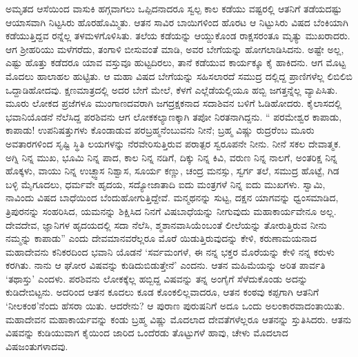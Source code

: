 ಅಮೃತದ ಆಸೆಯಿಂದ ವಾಸುಕಿ ಹಗ್ಗವಾಗಲು ಒಪ್ಪಿದನಾದರೂ ಸ್ವಲ್ಪ ಕಾಲ ಕಡೆಯು ವಷ್ಟರಲ್ಲಿ ಆತನಿಗೆ ತಡೆಯದಷ್ಟು ಆಯಾಸವಾಗಿ ನಿಟ್ಟಸಿರು ಹೊರಹೊಮ್ಮಿತು. ಆತನ ಸಾವಿರ ಬಾಯಿಗಳಿಂದ ಹೊರಟ ಆ ನಿಟ್ಟುಸಿರು ವಿಷದ ಬೆಂಕಿಯಾಗಿ ಕಡೆಯುತ್ತಿದ್ದವ ರನ್ನೆಲ್ಲ ತಳಮಳಗೊಳಿಸಿತು. ತಲೆಯ ಕಡೆಯನ್ನು ಆಯ್ದುಕೊಂಡ ರಾಕ್ಷಸರಂತೂ ಮೃತ್ಯು ಮುಖರಾದರು. ಆಗ ಶ್ರೀಹರಿಯು ಮಳೆಗರೆದು, ತಂಗಾಳಿ ಬೀಸುವಂತೆ ಮಾಡಿ, ಅವರ ಬೇಗೆಯನ್ನು ಹೋಗಲಾಡಿಸಿದನು. ಅಷ್ಟೇ ಅಲ್ಲ, ಎಷ್ಟು ಹೊತ್ತು ಕಡೆದರೂ ಯಾವ ವಸ್ತುವೂ ಹುಟ್ಟದಿರಲು, ತಾನೆ ಕಡೆಯುವ ಕಾರ್ಯಕ್ಕೂ ಕೈ ಹಾಕಿದನು. ಆಗ ಮೊಟ್ಟ ಮೊದಲು ಹಾಲಾಹಲ ಹುಟ್ಟಿತು. ಆ ಮಹಾ ವಿಷದ ಬೇಗೆಯನ್ನು ಸಹಿಸಲಾರದೆ ಸಮುದ್ರ ದಲ್ಲಿದ್ದ ಪ್ರಾಣಿಗಳೆಲ್ಲ ಲಿಬಿಲಿಬಿ ಒದ್ದಾಡಿಹೋದವು. ಕ್ಷಣಮಾತ್ರದಲ್ಲಿ ಅದರ ಬೇಗೆ ಮೇಲೆ, ಕೆಳಗೆ ಎಲ್ಲೆಡೆಯಲ್ಲಿಯೂ ಹಬ್ಬಿ ಜಗತ್ತನ್ನೆಲ್ಲ ವ್ಯಾಪಿಸಿತು. ಮೂರು ಲೋಕದ ಪ್ರಜೆಗಳೂ ಮುಂಗಾಣದವರಾಗಿ ಜಗದ್ರಕ್ಷಕನಾದ ಸದಾಶಿವನ ಬಳಿಗೆ ಓಡಿಹೋದರು. ಕೈಲಾಸದಲ್ಲಿ ಭವಾನಿಯೊಡನೆ ನೆಲೆಸಿದ್ದ ಪರಶಿವನು ಆಗ ಲೋಕಕಲ್ಯಾಣಕ್ಕಾಗಿ ತಪೋ ನಿರತನಾಗಿದ್ದನು. “ ಪರಮೇಶ್ವರ ಕಾಪಾಡು, ಕಾಪಾಡು! ಉಪನಿಷತ್ತುಗಳು ಕೊಂಡಾಡುವ ಪರಬ್ರಹ್ಮನೆಂಬುವನು ನೀನೆ; ಬ್ರಹ್ಮ ವಿಷ್ಣು ರುದ್ರರೆಂಬ ಮೂರು ಅವತಾರಗಳಿಂದ ಸೃಷ್ಟಿ ಸ್ಥಿತಿ ಲಯಗಳನ್ನು ನೆರವೇರಿಸುತ್ತಿರುವ ಪರಾತ್ಪರ ಸ್ವರೂಪನೇ ನೀನು. ನೀನೆ ಸಕಲ ದೇವಾತ್ಮಕ. ಅಗ್ನಿ ನಿನ್ನ ಮುಖ, ಭೂಮಿ ನಿನ್ನ ಪಾದ, ಕಾಲ ನಿನ್ನ ನಡಿಗೆ, ದಿಕ್ಕು ನಿನ್ನ ಕಿವಿ, ವರುಣ ನಿನ್ನ ನಾಲಗೆ, ಅಂತರಿಕ್ಷ ನಿನ್ನ ಹೊಕ್ಕಳು, ವಾಯು ನಿನ್ನ ಉಚ್ಛ್ವಾಸ ನಿಶ್ವಾಸ, ಸೂರ್ಯ ಕಣ್ಣು, ಚಂದ್ರ ಮನಸ್ಸು, ಸ್ವರ್ಗ ತಲೆ, ಸಮುದ್ರ ಹೊಟ್ಟೆ, ಗಿಡ ಬಳ್ಳಿ ಮೈಗೂದಲು, ಧರ್ಮವೇ ಹೃದಯ, ಸದ್ಯೋಜಾತಾದಿ ಐದು ಮಂತ್ರಗಳೆ ನಿನ್ನ ಐದು ಮುಖಗಳು. ಸ್ವಾಮಿ, ನಾವಿಂದು ವಿಷದ ಬಾಧೆಯಿಂದ ಬೆಂದುಹೋಗುತ್ತಿದ್ದೇವೆ. ಮನ್ಮಥನನ್ನು ಸುಟ್ಟ, ದಕ್ಷನ ಯಾಗವನ್ನು ಧ್ವಂಸಮಾಡಿದ, ತ್ರಿಪುರನನ್ನು ಸಂಹರಿಸಿದ, ಯಮನನ್ನು ಶಿಕ್ಷಿಸಿದ ನಿನಗೆ ವಿಷಬಾಧೆಯನ್ನು ನೀಗುವುದು ಮಹಾಕಾರ್ಯವೇನೂ ಅಲ್ಲ. ದೇವದೇವ, ಜ್ಞಾನಿಗಳ ಹೃದಯದಲ್ಲಿ ಸದಾ ನೆಲೆಸಿ, ಶ್ಮಶಾನವಾಸಿಯೆಂಬಂತೆ ಲೀಲೆಯನ್ನು ತೋರುತ್ತಿರುವ ನೀನು ನಮ್ಮನ್ನು ಕಾಪಾಡು” ಎಂದು ದೇವಮಾನವರೆಲ್ಲರೂ ಮೊರೆ ಯಿಡುತ್ತಿರುವುದನ್ನು ಕೇಳಿ, ಕರುಣಾಮಯನಾದ ಮಹಾದೇವನು ಕನಿಕರದಿಂದ ಭವಾನಿ ಯೊಡನೆ ‘ಸರ್ವಮಂಗಳೆ, ಈ ನನ್ನ ಭಕ್ತರ ಮೊರೆಯನ್ನು ಕೇಳಿ ನನ್ನ ಕರುಳು ಕರಗಿತು. ನಾನು ಆ ಘೋರ ವಿಷವನ್ನು ಕುಡಿದುಬಿಡುತ್ತೇನೆ’ ಎಂದನು. ಆತನ ಮಹಿಮೆಯನ್ನು ಅರಿತ ಪಾರ್ವತಿ ‘ತಥಾಸ್ತು’ ಎಂದಳು. ಪರಶಿವನು ಲೋಕಕ್ಕೆಲ್ಲ ಹಬ್ಬಿದ್ದ ವಿಷವನ್ನು ತನ್ನ ಅಂಗೈಗೆ ಸೆಳೆದುಕೊಂಡು ಅದನ್ನು ಕುಡಿದೇಬಿಟ್ಟನು. ಅದರಿಂದ ಆತನ ಕೂದಲು ಕೂಡ ಕೊಂಕಲಿಲ್ಲವಾದರೂ, ಆತನ ಕಂಠವು ಕಪ್ಪಗಾಗಿ ಆತನಿಗೆ ‘ನೀಲಕಂಠ’ನೆಂದು ಹೆಸರಾ ಯಿತು. ಆದರೇನು? ಆ ಪುರಾಣ ಪುರುಷನಿಗೆ ಅದೂ ಒಂದು ಅಲಂಕಾರವಾದಂತಾಯಿತು. ಮಹಾದೇವನ ಮಹಾಕಾರ್ಯವನ್ನು ಕಂಡು ಬ್ರಹ್ಮ ವಿಷ್ಣು ಮೊದಲಾದ ದೇವತೆಗಳೆಲ್ಲರೂ ಆತನನ್ನು ಸ್ತುತಿಸಿದರು. ಆತನು ವಿಷವನ್ನು ಕುಡಿಯುವಾಗ ಕೈಯಿಂದ ಜಾರಿದ ಒಂದೆರಡು ತೊಟ್ಟುಗಳೆ ಹಾವು, ಚೇಳು ಮೊದಲಾದ ವಿಷಜಂತುಗಳಾದವು. 


